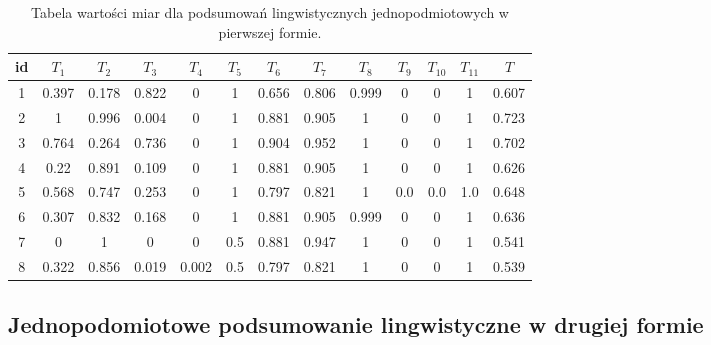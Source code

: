\documentclass{classrep}
\begin{document}
\begin{center}
  \begin{table}[H]
    \begin{adjustbox}{center=11cm}
    \begin{tabularx}{\textwidth}{ccccccccccccc}
    
    id & $T_1$ & $T_2$ & $T_3$ & $T_4$ & $T_5$ & $T_6$ & $T_7$ & $T_8$ & $T_9$ & $T_{10}$ & $T_{11}$ & $T$ \\ \hline 

    1 &0.397 & 0.178 & 0.822 & 0 & 1 & 0.656 & 0.806 & 0.999 & 0 & 0 & 1 & 0.607\\ \hline
    2 &1 & 0.996 & 0.004 & 0 & 1 & 0.881 & 0.905 & 1 & 0 & 0 & 1 & 0.723\\ \hline
    3 &0.764 & 0.264 & 0.736 & 0 & 1 & 0.904 & 0.952 & 1 & 0 & 0 & 1 & 0.702 \\ \hline
    4 &0.22 & 0.891 & 0.109 & 0 & 1 & 0.881 & 0.905 & 1 & 0 & 0 & 1 & 0.626  \\ \hline
    5 &0.568 & 0.747 & 0.253 & 0 & 1 & 0.797 & 0.821 & 1 & 0.0 & 0.0 & 1.0 & 0.648  \\ \hline  
    6 &0.307 & 0.832 & 0.168 & 0 & 1 & 0.881 & 0.905 & 0.999 & 0 & 0 & 1 & 0.636  \\ \hline  
    7 &0 & 1 & 0 & 0 & 0.5 & 0.881 & 0.947 & 1 & 0 & 0 & 1 & 0.541 \\ \hline 
    8 &0.322 & 0.856 & 0.019 & 0.002 & 0.5 & 0.797 & 0.821 & 1 & 0 & 0 & 1 & 0.539 \\ \hline 

  \end{tabularx}
\end{adjustbox}
  \caption{Tabela wartości miar dla podsumowań lingwistycznych jednopodmiotowych w pierwszej formie.}
\end{table}
\end{center}


\subsection{Jednopodomiotowe podsumowanie lingwistyczne w drugiej formie}
\end{document}
